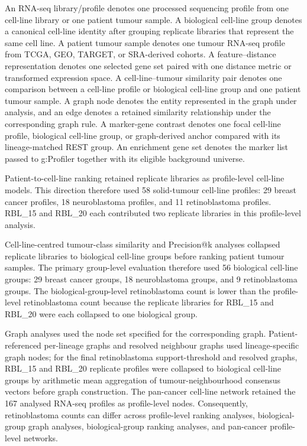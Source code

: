 An RNA-seq library/profile denotes one processed sequencing profile from one cell-line library or one patient tumour sample. A biological cell-line group denotes a canonical cell-line identity after grouping replicate libraries that represent the same cell line. A patient tumour sample denotes one tumour RNA-seq profile from TCGA, GEO, TARGET, or SRA-derived cohorts. A feature--distance representation denotes one selected gene set paired with one distance metric or transformed expression space. A cell-line--tumour similarity pair denotes one comparison between a cell-line profile or biological cell-line group and one patient tumour sample. A graph node denotes the entity represented in the graph under analysis, and an edge denotes a retained similarity relationship under the corresponding graph rule. A marker-gene contrast denotes one focal cell-line profile, biological cell-line group, or graph-derived anchor compared with its lineage-matched REST group. An enrichment gene set denotes the marker list passed to g:Profiler together with its eligible background universe.

Patient-to-cell-line ranking retained replicate libraries as profile-level cell-line models. This direction therefore used 58 solid-tumour cell-line profiles: 29 breast cancer profiles, 18 neuroblastoma profiles, and 11 retinoblastoma profiles. RBL\_15 and RBL\_20 each contributed two replicate libraries in this profile-level analysis.

Cell-line-centred tumour-class similarity and Precision@k analyses collapsed replicate libraries to biological cell-line groups before ranking patient tumour samples. The primary group-level evaluation therefore used 56 biological cell-line groups: 29 breast cancer groups, 18 neuroblastoma groups, and 9 retinoblastoma groups. The biological-group-level retinoblastoma count is lower than the profile-level retinoblastoma count because the replicate libraries for RBL\_15 and RBL\_20 were each collapsed to one biological group.

Graph analyses used the node set specified for the corresponding graph. Patient-referenced per-lineage graphs and resolved neighbour graphs used lineage-specific graph nodes; for the final retinoblastoma support-threshold and resolved graphs, RBL\_15 and RBL\_20 replicate profiles were collapsed to biological cell-line groups by arithmetic mean aggregation of tumour-neighbourhood consensus vectors before graph construction. The pan-cancer cell-line network retained the 167 analysed RNA-seq profiles as profile-level nodes. Consequently, retinoblastoma counts can differ across profile-level ranking analyses, biological-group graph analyses, biological-group ranking analyses, and pan-cancer profile-level networks.

